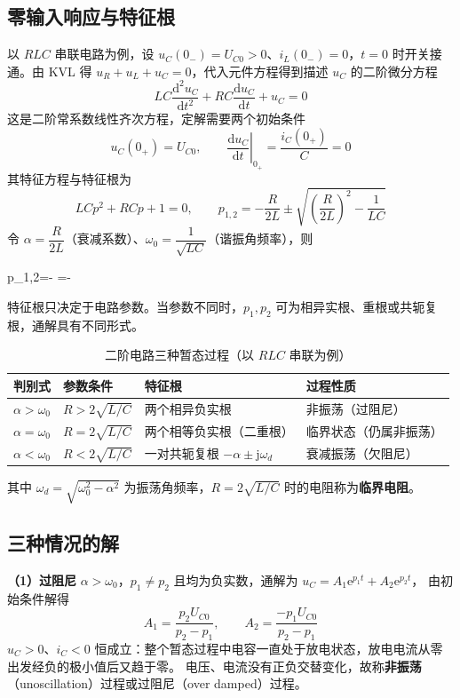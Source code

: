 \subsection{零输入响应与特征根}
以 $RLC$ 串联电路为例，设 $u_C(0_-)=U_{C0}>0$、$i_L(0_-)=0$，$t=0$ 时开关接通。由 KVL 得
$u_R+u_L+u_C=0$，代入元件方程得到描述 $u_C$ 的二阶微分方程
\begin{equation}
  LC\frac{\mathrm{d}^2u_C}{\mathrm{d}t^2}+RC\frac{\mathrm{d}u_C}{\mathrm{d}t}+u_C=0
  \label{eq:ch8-rlc}
\end{equation}
这是二阶常系数线性齐次方程，定解需要两个初始条件
\begin{equation}
  u_C(0_+)=U_{C0},\qquad
  \left.\frac{\mathrm{d}u_C}{\mathrm{d}t}\right|_{0_+}=\frac{i_C(0_+)}{C}=0
\end{equation}
其特征方程与特征根为
\begin{equation}
  LCp^2+RCp+1=0,\qquad
  p_{1,2}=-\frac{R}{2L}\pm\sqrt{\left(\frac{R}{2L}\right)^2-\frac{1}{LC}}
\end{equation}
令 $\alpha=\dfrac{R}{2L}$（衰减系数）、$\omega_0=\dfrac{1}{\sqrt{LC}}$（谐振角频率），则
\begin{keyformula}{p_{1,2}=-\alpha\pm{}
  =-\pm{}}
\end{keyformula}
特征根只决定于电路参数。当参数不同时，$p_1,p_2$ 可为相异实根、重根或共轭复根，通解具有不同形式。

\begin{table}[htbp]
  \centering
  \renewcommand{\tablename}{表}%
  \caption{二阶电路三种暂态过程（以 $RLC$ 串联为例）}
  \begin{tabular}{llll}
    \toprule
    判别式 & 参数条件 & 特征根 & 过程性质 \\
    \midrule
    $\alpha>\omega_0$ & $R>2\sqrt{L/C}$ & 两个相异负实根 & 非振荡（过阻尼） \\
    $\alpha=\omega_0$ & $R=2\sqrt{L/C}$ & 两个相等负实根（二重根） & 临界状态（仍属非振荡） \\
    $\alpha<\omega_0$ & $R<2\sqrt{L/C}$ & 一对共轭复根 $-\alpha\pm\mathrm{j}\omega_d$ & 衰减振荡（欠阻尼） \\
    \bottomrule
  \end{tabular}
\end{table}

其中 $\omega_d=\sqrt{\omega_0^2-\alpha^2}$ 为振荡角频率，$R=2\sqrt{L/C}$ 时的电阻称为\textbf{临界电阻}。

\subsection{三种情况的解}
\textbf{（1）过阻尼} $\alpha>\omega_0$，$p_1\ne p_2$ 且均为负实数，通解为 $u_C=A_1\mathrm{e}^{p_1t}+A_2\mathrm{e}^{p_2t}$，
由初始条件解得
\begin{equation}
  A_1=\frac{p_2U_{C0}}{p_2-p_1},\qquad A_2=\frac{-p_1U_{C0}}{p_2-p_1}
\end{equation}
$u_C>0$、$i_C<0$ 恒成立：整个暂态过程中电容一直处于放电状态，放电电流从零出发经负的极小值后又趋于零。
电压、电流没有正负交替变化，故称\textbf{非振荡}（unoscillation）过程或过阻尼（over damped）过程。

